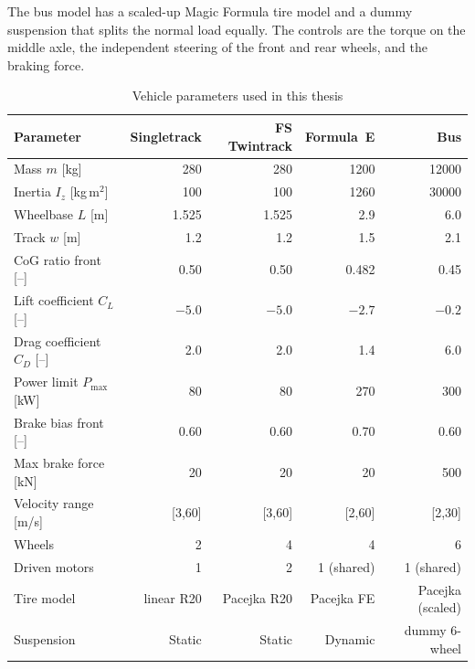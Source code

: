 The bus model has a scaled-up Magic Formula tire model and a dummy suspension that splits the normal load equally. The controls are the torque on the middle axle, the independent steering of the front and rear wheels, and the braking force.
\begin{table}[H]
    \centering
    \caption{Vehicle parameters used in this thesis}
    \label{tab:vehicle_params}
    \footnotesize
    \setlength{\tabcolsep}{4pt}
    \begin{tabular}{lrrrr}
        \toprule
        Parameter & Singletrack & FS Twintrack & Formula~E & Bus \\
        \midrule
        Mass $m$ [kg]                 & 280   & 280   & 1200   & 12000  \\
        Inertia $I_z$ [kg\,m$^2$]     & 100   & 100   & 1260   & 30000  \\
        Wheelbase $L$ [m]             & 1.525 & 1.525 & 2.9    & 6.0    \\
        Track $w$ [m]                 & 1.2   & 1.2   & 1.5    & 2.1    \\
        CoG ratio front [--]          & 0.50  & 0.50  & 0.482  & 0.45   \\
        Lift coefficient $C_L$ [--]   & $-5.0$ & $-5.0$ & $-2.7$ & $-0.2$ \\
        Drag coefficient $C_D$ [--]   & 2.0   & 2.0   & 1.4    & 6.0    \\
        Power limit $P_{\max}$ [kW]   & 80    & 80    & 270    & 300    \\
        Brake bias front [--]         & 0.60  & 0.60  & 0.70   & 0.60   \\
        Max brake force [kN]          & 20    & 20    & 20     & 500    \\
        Velocity range [m/s]          & [3,60]& [3,60]& [2,60] & [2,30] \\
        \midrule
        Wheels                        & 2     & 4     & 4      & 6      \\
        Driven motors                 & 1     & 2     & 1 (shared) & 1 (shared)  \\
        Tire model                    & linear R20 & Pacejka R20 & Pacejka FE & Pacejka (scaled) \\
        Suspension                    & Static & Static    & Dynamic & dummy 6-wheel \\
        \bottomrule
    \end{tabular}
\end{table}

